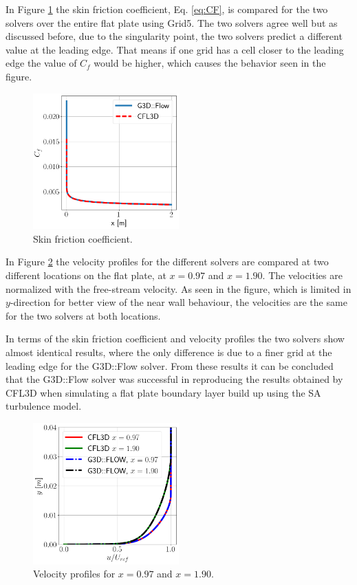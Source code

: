In Figure \ref{fig:FPCF} the skin friction coefficient, Eq. \ref{eq:CF}, is compared for the two solvers over the entire flat plate using Grid5. The two solvers agree well but as discussed before, due to the singularity point, the two solvers predict a different value at the leading edge. That means if one grid has a cell closer to the leading edge the value of $C_f$ would be higher, which causes the behavior seen in the figure.
\begin{figure}[H]
  \centering
  \includegraphics[width=0.5\textwidth]{figures/FPCF.png}
  \caption{Skin friction coefficient.} \label{fig:FPCF}
\end{figure}

In Figure \ref{fig:FPvel} the velocity profiles for the different solvers are compared at two different locations on the flat plate, at $x=0.97$ and $x=1.90$. The velocities are normalized with the free-stream velocity. As seen in the figure, which is limited in $y$-direction for better view of the near wall behaviour, the velocities are the same for the two solvers at both locations. 

In terms of the skin friction coefficient and velocity profiles the two solvers show almost identical results, where the only difference is due to a finer grid at the leading edge for the G3D::Flow solver. From these results it can be concluded that the G3D::Flow solver was successful in reproducing the results obtained by CFL3D when simulating a flat plate boundary layer build up using the SA turbulence model.
\begin{figure}[H]
  \centering
  \includegraphics[width=0.5\textwidth]{figures/FPVelComp.png}
  \caption{Velocity profiles for $x=0.97$ and $x=1.90$.} \label{fig:FPvel}
\end{figure}

